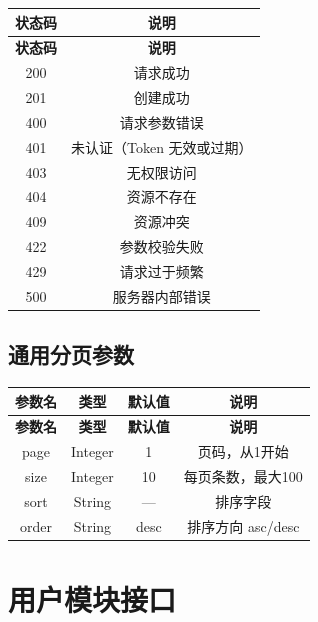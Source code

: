 \documentclass[12pt,a4paper,UTF8]{ctexart}
\begin{document}
\begin{longtable}{|c|c|}
    \hline
    \textbf{状态码} & \textbf{说明} \\
    \hline
    \endfirsthead
    \hline
    \textbf{状态码} & \textbf{说明} \\
    \hline
    \endhead
    \hline
    \endfoot

    200 & 请求成功 \\
    \hline
    201 & 创建成功 \\
    \hline
    400 & 请求参数错误 \\
    \hline
    401 & 未认证（Token 无效或过期） \\
    \hline
    403 & 无权限访问 \\
    \hline
    404 & 资源不存在 \\
    \hline
    409 & 资源冲突 \\
    \hline
    422 & 参数校验失败 \\
    \hline
    429 & 请求过于频繁 \\
    \hline
    500 & 服务器内部错误 \\
    \hline
\end{longtable}

\subsection{通用分页参数}

\begin{longtable}{|c|c|c|c|}
    \hline
    \textbf{参数名} & \textbf{类型} & \textbf{默认值} & \textbf{说明} \\
    \hline
    \endfirsthead
    \hline
    \textbf{参数名} & \textbf{类型} & \textbf{默认值} & \textbf{说明} \\
    \hline
    \endhead
    \hline
    \endfoot

    page & Integer & 1 & 页码，从1开始 \\
    \hline
    size & Integer & 10 & 每页条数，最大100 \\
    \hline
    sort & String & --- & 排序字段 \\
    \hline
    order & String & desc & 排序方向 asc/desc \\
    \hline
\end{longtable}

\section{用户模块接口}
\end{document}
